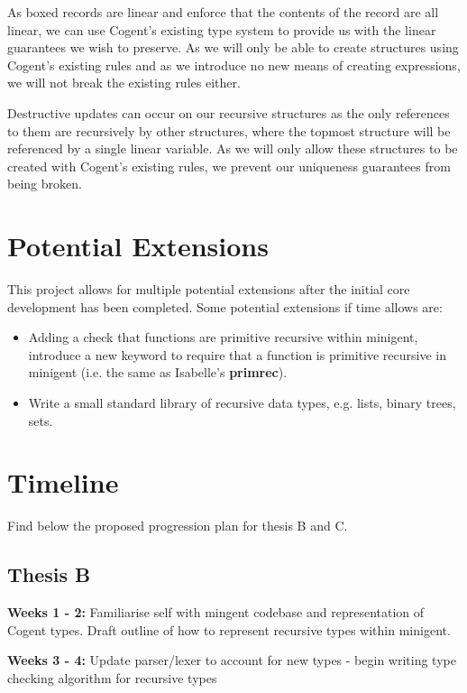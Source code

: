 As boxed records are linear and enforce that the contents of the record are all linear, we
can use Cogent's existing type system to provide us with the linear guarantees we wish to preserve.
As we will only be able to create structures using Cogent's existing rules and as we introduce
no new means of creating expressions, we will not break the existing rules either. 

Destructive updates can occur on our recursive structures as the only references to them are
recursively by other structures, where the topmost structure will be referenced by a single linear
variable. As we will only allow these structures to be created with Cogent's existing rules,
we prevent our uniqueness guarantees from being broken.

\section{Potential Extensions}

This project allows for multiple potential extensions after the initial core development has been completed.
Some potential extensions if time allows are:

\begin{itemize}
    \item Adding a check that functions are primitive recursive within minigent, introduce a new keyword
          to require that a function is primitive recursive in minigent (i.e. the same as
          Isabelle's \textbf{primrec}).
    \item Write a small standard library of recursive data types, e.g. lists, binary trees, 
          sets.
\end{itemize}

\section{Timeline}

Find below the proposed progression plan for thesis B and C.

\subsection{Thesis B}

\textbf{Weeks 1 - 2:} Familiarise self with mingent codebase and representation of Cogent types. Draft outline
of how to represent recursive types within minigent.

\textbf{Weeks 3 - 4:} Update parser/lexer to account for new types - begin writing type checking algorithm for
recursive types

